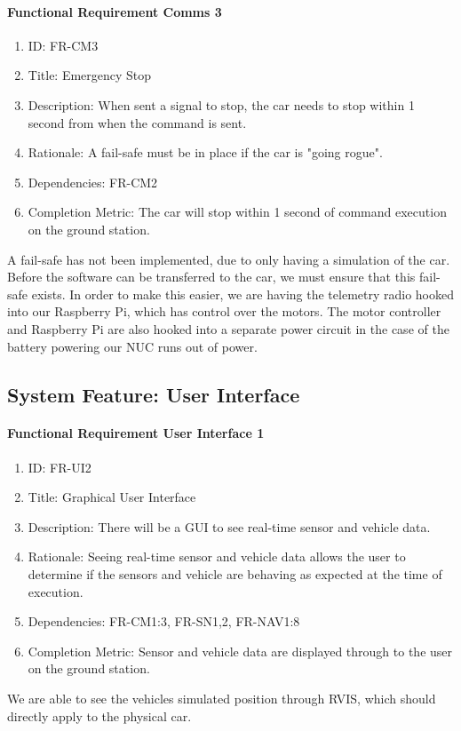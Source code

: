 \documentclass[compsoc,draftclsnofoot,onecolumn,10pt]{IEEEtran}
\begin{document}
    \paragraph{\textbf{Functional Requirement Comms 3}}
		\begin{enumerate}
			\item ID: FR-CM3
			\item Title: Emergency Stop
			\item Description: When sent a signal to stop, the car needs to stop within 1 second from when the command is sent.
			\item Rationale: A fail-safe must be in place if the car is "going rogue".
			\item Dependencies: FR-CM2
			\item Completion Metric: The car will stop within 1 second of command execution on the ground station.
		\end{enumerate}
    A fail-safe has not been implemented, due to only having a simulation of the car. Before the software can be transferred to the car, we must ensure that this fail-safe exists. In order to make this easier, we are having the telemetry radio hooked into our Raspberry Pi, which has control over the motors. The motor controller and Raspberry Pi are also hooked into a separate power circuit in the case of the battery powering our NUC runs out of power.
    
\subsection{System Feature: User Interface}

	\paragraph{\textbf{Functional Requirement User Interface 1}}
		\begin{enumerate}
			\item ID: FR-UI2
			\item Title: Graphical User Interface
			\item Description: There will be a GUI to see real-time sensor and vehicle data.
			\item Rationale: Seeing real-time sensor and vehicle data allows the user to determine if the sensors and vehicle are behaving as expected at the time of execution.
			\item Dependencies: FR-CM1:3, FR-SN1,2, FR-NAV1:8
			\item Completion Metric: Sensor and vehicle data are displayed through to the user on the ground station.
		\end{enumerate}
    We are able to see the vehicles simulated position through RVIS, which should directly apply to the physical car. 
    
\end{document}
